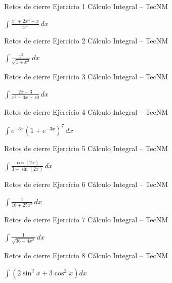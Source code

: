 \documentclass[aspectratio=169,12pt]{beamer}
\newcommand{\ejercicio}[1]{%
  \begin{center}
  \vfill
  {\fontsize{24}{30}\selectfont #1}
  \vfill
  \end{center}
}
\begin{document}
\begin{frame}{Retos de cierre}
\small Ejercicio 1 \hfill Cálculo Integral -- TecNM
\ejercicio{$\displaystyle \int\frac{x^5+2x^3-x}{x^2}\,dx$}
\end{frame}

\begin{frame}{Retos de cierre}
\small Ejercicio 2 \hfill Cálculo Integral -- TecNM
\ejercicio{$\displaystyle \int\frac{x^2}{\sqrt{1+x^3}}\,dx$}
\end{frame}

\begin{frame}{Retos de cierre}
\small Ejercicio 3 \hfill Cálculo Integral -- TecNM
\ejercicio{$\displaystyle \int\frac{2x-3}{x^2-3x+10}\,dx$}
\end{frame}

\begin{frame}{Retos de cierre}
\small Ejercicio 4 \hfill Cálculo Integral -- TecNM
\ejercicio{$\displaystyle \int e^{-3x}(1+e^{-3x})^7\,dx$}
\end{frame}

\begin{frame}{Retos de cierre}
\small Ejercicio 5 \hfill Cálculo Integral -- TecNM
\ejercicio{$\displaystyle \int\frac{\cos(2x)}{3+\sin(2x)}\,dx$}
\end{frame}

\begin{frame}{Retos de cierre}
\small Ejercicio 6 \hfill Cálculo Integral -- TecNM
\ejercicio{$\displaystyle \int\frac{1}{16+25x^2}\,dx$}
\end{frame}

\begin{frame}{Retos de cierre}
\small Ejercicio 7 \hfill Cálculo Integral -- TecNM
\ejercicio{$\displaystyle \int\frac{1}{\sqrt{36-4x^2}}\,dx$}
\end{frame}

\begin{frame}{Retos de cierre}
\small Ejercicio 8 \hfill Cálculo Integral -- TecNM
\ejercicio{$\displaystyle \int\left(2\sin^2x+3\cos^2x\right)dx$}
\end{frame}
\end{document}
